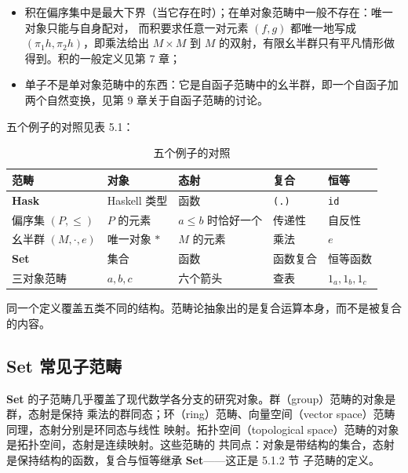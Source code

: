 \begin{itemize}
\tightlist
\item
  积在偏序集中是最大下界（当它存在时）；在单对象范畴中一般不存在：唯一对象只能与自身配对，
  而积要求任意一对元素 \((f, g)\) 都唯一地写成 \((\pi_1 h, \pi_2 h)\)，即乘法给出
  \(M \times M\) 到 \(M\) 的双射，有限幺半群只有平凡情形做得到。积的一般定义见第 7 章；
\item
  单子不是单对象范畴中的东西：它是自函子范畴中的幺半群，即一个自函子加两个自然变换，见第 9
  章关于自函子范畴的讨论。
\end{itemize}

五个例子的对照见表 5.1：

{\small\setlength{\tabcolsep}{4pt} %
\begin{longtable}[]{@{}
  l
  l
  l
  l
  l@{}}
\caption{五个例子的对照}\label{tab:5-1}\\
\toprule\noalign{}
\textbf{范畴} & \textbf{对象} & \textbf{态射} & \textbf{复合} & \textbf{恒等} \\
\midrule\noalign{}
\endhead
\bottomrule\noalign{}
\endlastfoot
\textbf{Hask} & Haskell 类型 & 函数 & \passthrough{\lstinline!(.)!} & \passthrough{\lstinline!id!} \\
偏序集 \((P, \leq)\) & \(P\) 的元素 & \(a \le b\) 时恰好一个 & 传递性 & 自反性 \\
幺半群 \((M, \cdot, e)\) & 唯一对象 \(\ast\) & \(M\) 的元素 & 乘法 & \(e\) \\
\textbf{Set} & 集合 & 函数 & 函数复合 & 恒等函数 \\
三对象范畴 & \(a, b, c\) & 六个箭头 & 查表 & \(1_a, 1_b, 1_c\) \\
\end{longtable}
}

同一个定义覆盖五类不同的结构。范畴论抽象出的是复合运算本身，而不是被复合的内容。

\subsection{\texorpdfstring{\textbf{Set} 常见子范畴}{Set 常见子范畴}}\label{set-ux5e38ux89c1ux5b50ux8303ux7574}

\textbf{Set} 的子范畴几乎覆盖了现代数学各分支的研究对象。群（group）范畴的对象是群，态射是保持
乘法的群同态；环（ring）范畴、向量空间（vector space）范畴同理，态射分别是环同态与线性
映射。拓扑空间（topological space）范畴的对象是拓扑空间，态射是连续映射。这些范畴的
共同点：对象是带结构的集合，态射是保持结构的函数，复合与恒等继承 \textbf{Set}------这正是 5.1.2 节
子范畴的定义。

